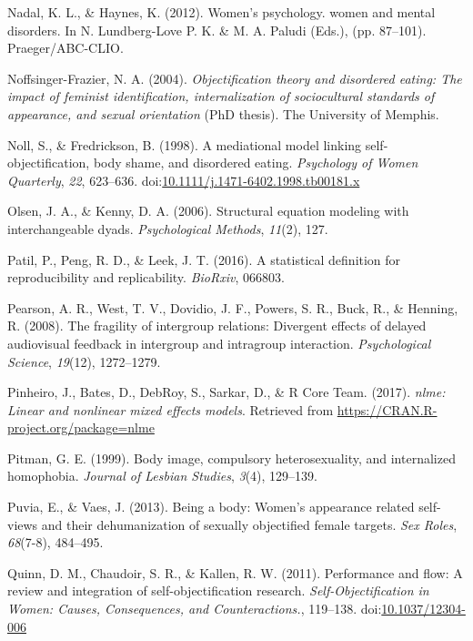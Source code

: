 \documentclass[man]{apa6}
\begin{document}
\hypertarget{ref-nadal2012effects}{}
Nadal, K. L., \& Haynes, K. (2012). Women's psychology. women and mental
disorders. In N. Lundberg-Love P. K. \& M. A. Paludi (Eds.), (pp.
87--101). Praeger/ABC-CLIO.

\hypertarget{ref-noffsinger2004objectification}{}
Noffsinger-Frazier, N. A. (2004). \emph{Objectification theory and
disordered eating: The impact of feminist identification,
internalization of sociocultural standards of appearance, and sexual
orientation} (PhD thesis). The University of Memphis.

\hypertarget{ref-nollfredrickson1998}{}
Noll, S., \& Fredrickson, B. (1998). A mediational model linking
self-objectification, body shame, and disordered eating.
\emph{Psychology of Women Quarterly}, \emph{22}, 623--636.
doi:\href{https://doi.org/10.1111/j.1471-6402.1998.tb00181.x}{10.1111/j.1471-6402.1998.tb00181.x}

\hypertarget{ref-olsen2006structural}{}
Olsen, J. A., \& Kenny, D. A. (2006). Structural equation modeling with
interchangeable dyads. \emph{Psychological Methods}, \emph{11}(2), 127.

\hypertarget{ref-patil2016statistical}{}
Patil, P., Peng, R. D., \& Leek, J. T. (2016). A statistical definition
for reproducibility and replicability. \emph{BioRxiv}, 066803.

\hypertarget{ref-pearson2008fragility}{}
Pearson, A. R., West, T. V., Dovidio, J. F., Powers, S. R., Buck, R., \&
Henning, R. (2008). The fragility of intergroup relations: Divergent
effects of delayed audiovisual feedback in intergroup and intragroup
interaction. \emph{Psychological Science}, \emph{19}(12), 1272--1279.

\hypertarget{ref-R-nlme}{}
Pinheiro, J., Bates, D., DebRoy, S., Sarkar, D., \& R Core Team. (2017).
\emph{nlme: Linear and nonlinear mixed effects models}. Retrieved from
\url{https://CRAN.R-project.org/package=nlme}

\hypertarget{ref-pitman1999body}{}
Pitman, G. E. (1999). Body image, compulsory heterosexuality, and
internalized homophobia. \emph{Journal of Lesbian Studies}, \emph{3}(4),
129--139.

\hypertarget{ref-puvia2013being}{}
Puvia, E., \& Vaes, J. (2013). Being a body: Women's appearance related
self-views and their dehumanization of sexually objectified female
targets. \emph{Sex Roles}, \emph{68}(7-8), 484--495.

\hypertarget{ref-quinnetal}{}
Quinn, D. M., Chaudoir, S. R., \& Kallen, R. W. (2011). Performance and
flow: A review and integration of self-objectification research.
\emph{Self-Objectification in Women: Causes, Consequences, and
Counteractions.}, 119--138.
doi:\href{https://doi.org/10.1037/12304-006}{10.1037/12304-006}
\end{document}
